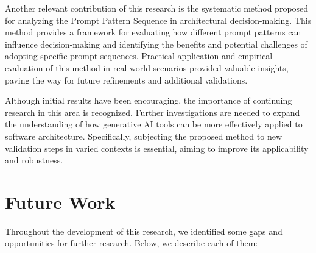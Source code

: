 Another relevant contribution of this research is the systematic method proposed for analyzing the Prompt Pattern Sequence in architectural decision-making. This method provides a framework for evaluating how different prompt patterns can influence decision-making and identifying the benefits and potential challenges of adopting specific prompt sequences. Practical application and empirical evaluation of this method in real-world scenarios provided valuable insights, paving the way for future refinements and additional validations.

Although initial results have been encouraging, the importance of continuing research in this area is recognized. Further investigations are needed to expand the understanding of how generative AI tools can be more effectively applied to software architecture. Specifically, subjecting the proposed method to new validation steps in varied contexts is essential, aiming to improve its applicability and robustness.

\section{Future Work}
Throughout the development of this research, we identified some gaps and opportunities for further research. Below, we describe each of them:

